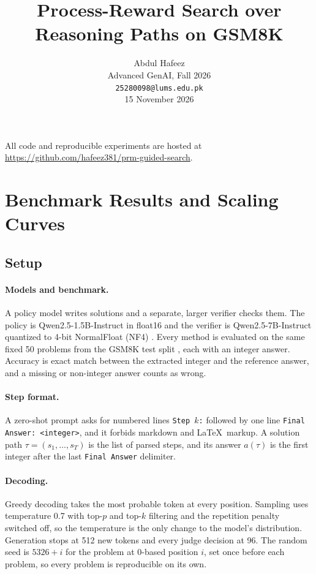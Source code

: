 \documentclass{article}
\title{Process-Reward Search over Reasoning Paths on GSM8K}
\author{%
  Abdul Hafeez \\
  Advanced GenAI, Fall 2026 \\
  \texttt{25280098@lums.edu.pk} \\
  15 November 2026
}
\begin{document}
\maketitle

\vspace{-1em}
All code and reproducible experiments are hosted at \url{https://github.com/hafeez381/prm-guided-search}.

\section{Benchmark Results and Scaling Curves}
\label{sec:results}

\subsection{Setup}

\paragraph{Models and benchmark.} A policy model writes solutions and a separate, larger verifier checks them. The policy is Qwen2.5-1.5B-Instruct in float16 and the verifier is Qwen2.5-7B-Instruct quantized to 4-bit NormalFloat (NF4) \citep{qwen2025qwen25technicalreport}. Every method is evaluated on the same fixed 50 problems from the GSM8K test split \citep{cobbe2021trainingverifierssolvemath}, each with an integer answer. Accuracy is exact match between the extracted integer and the reference answer, and a missing or non-integer answer counts as wrong.

\paragraph{Step format.} A zero-shot prompt asks for numbered lines \texttt{Step $k$:} followed by one line \texttt{Final Answer: <integer>}, and it forbids markdown and \LaTeX\ markup. A solution path $\tau=(s_1,\dots,s_T)$ is the list of parsed steps, and its answer $a(\tau)$ is the first integer after the last \texttt{Final Answer} delimiter.

\paragraph{Decoding.} Greedy decoding takes the most probable token at every position. Sampling uses temperature 0.7 with top-$p$ and top-$k$ filtering and the repetition penalty switched off, so the temperature is the only change to the model's distribution. Generation stops at 512 new tokens and every judge decision at 96. The random seed is $5326+i$ for the problem at 0-based position $i$, set once before each problem, so every problem is reproducible on its own.
\end{document}
